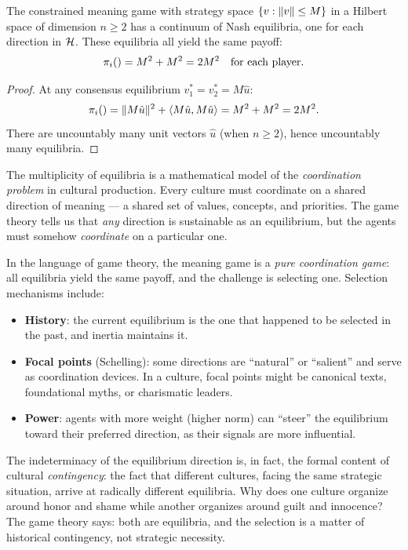 \begin{theorem}
\label{thm:continuum-ne}
The constrained meaning game with strategy space $\{v : \lVert v \rVert \leq M\}$ in
a Hilbert space of dimension $n \geq 2$ has a continuum of Nash equilibria,
one for each direction in $\mathcal{H}$. These equilibria all yield the same payoff:
\[
  \pi_{i}() = M^2 + M^2 = 2M^2 \quad \text{for each player.}
\]
\end{theorem}

\begin{proof}
At any consensus equilibrium $v_1^* = v_2^* = M\hat{u}$:
\[
  \pi_{i}() = \lVert M\hat{u} \rVert^2 + \langle M\hat{u}, M\hat{u} \rangle = M^2 + M^2 = 2M^2.
\]
There are uncountably many unit vectors $\hat{u}$ (when $n \geq 2$), hence
uncountably many equilibria.
\end{proof}

\begin{interpretation}
\label{interp:coordination}
The multiplicity of equilibria is a mathematical model of the \emph{coordination
problem} in cultural production. Every culture must coordinate on a shared
direction of meaning --- a shared set of values, concepts, and priorities. The
game theory tells us that \emph{any} direction is sustainable as an equilibrium,
but the agents must somehow \emph{coordinate} on a particular one.

In the language of game theory, the meaning game is a \emph{pure coordination
game}: all equilibria yield the same payoff, and the challenge is selecting one.
Selection mechanisms include:

\begin{itemize}
\item \textbf{History}: the current equilibrium is the one that happened to be
selected in the past, and inertia maintains it.
\item \textbf{Focal points} (Schelling): some directions are ``natural'' or
``salient'' and serve as coordination devices. In a culture, focal points might
be canonical texts, foundational myths, or charismatic leaders.
\item \textbf{Power}: agents with more weight (higher norm) can ``steer'' the
equilibrium toward their preferred direction, as their signals are more
influential.
\end{itemize}

The indeterminacy of the equilibrium direction is, in fact, the formal content
of cultural \emph{contingency}: the fact that different cultures, facing the
same strategic situation, arrive at radically different equilibria. Why does
one culture organize around honor and shame while another organizes around guilt
and innocence? The game theory says: both are equilibria, and the selection
is a matter of historical contingency, not strategic necessity.
\end{interpretation}

